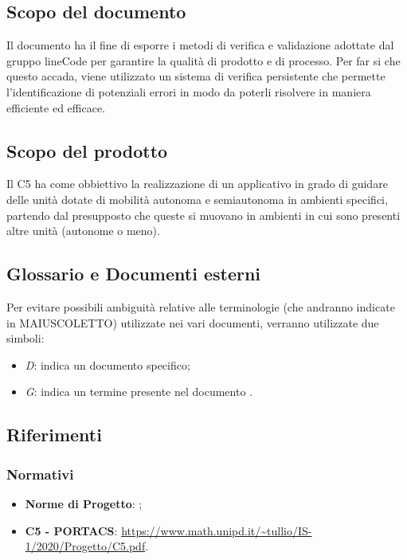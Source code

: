 \subsection{Scopo del documento}
Il documento ha il fine di esporre i metodi di verifica e validazione adottate dal gruppo lineCode per garantire la qualità di prodotto e di processo. Per far si che questo accada, viene utilizzato un sistema di verifica persistente che permette l'identificazione di potenziali errori in modo da poterli risolvere in maniera efficiente ed efficace.

\subsection{Scopo del prodotto}
Il  C5 ha come obbiettivo la realizzazione di un applicativo  in grado di guidare delle unità dotate di mobilità autonoma e semiautonoma in ambienti specifici, partendo dal presupposto che queste si muovano in ambienti in cui sono presenti altre unità (autonome o meno).

\subsection{Glossario e Documenti esterni}
Per evitare possibili ambiguità relative alle terminologie (che andranno indicate in MAIUSCOLETTO) utilizzate	nei vari documenti, verranno utilizzate due simboli:
\begin{itemize}
	\item \textit{D}: indica un documento specifico;
	\item \textit{G}: indica un termine presente nel documento .
\end{itemize}

\subsection{Riferimenti}

\subsubsection{Normativi}
\begin{itemize}
	\item \textbf{Norme di Progetto}: ;
	\item \textbf{ C5 - PORTACS}:					\url{https://www.math.unipd.it/~tullio/IS-1/2020/Progetto/C5.pdf}.
\end{itemize}


